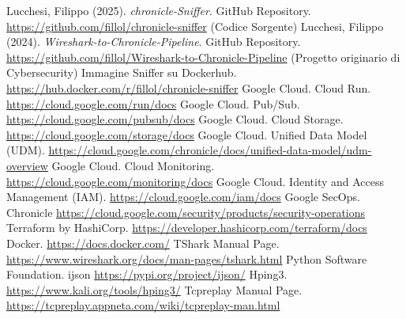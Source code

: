 \documentclass[11pt, a4paper]{article}
\begin{document}
\begin{thebibliography}{99}
     Lucchesi, Filippo (2025). \textit{chronicle-Sniffer}. GitHub Repository. \url{https://github.com/fillol/chronicle-sniffer} (Codice Sorgente)
     Lucchesi, Filippo (2024). \textit{Wireshark-to-Chronicle-Pipeline}. GitHub Repository. \url{https://github.com/fillol/Wireshark-to-Chronicle-Pipeline} (Progetto originario di Cybersecurity)
     Immagine Sniffer su Dockerhub. \url{https://hub.docker.com/r/fillol/chronicle-sniffer}
     Google Cloud. Cloud Run. \url{https://cloud.google.com/run/docs}
     Google Cloud. Pub/Sub. \url{https://cloud.google.com/pubsub/docs}
     Google Cloud. Cloud Storage. \url{https://cloud.google.com/storage/docs}
     Google Cloud. Unified Data Model (UDM). \url{https://cloud.google.com/chronicle/docs/unified-data-model/udm-overview}
     Google Cloud. Cloud Monitoring. \url{https://cloud.google.com/monitoring/docs}
     Google Cloud. Identity and Access Management (IAM). \url{https://cloud.google.com/iam/docs}
     Google SecOps. Chronicle \url{https://cloud.google.com/security/products/security-operations}
     Terraform by HashiCorp. \url{https://developer.hashicorp.com/terraform/docs}
     Docker. \url{https://docs.docker.com/}
     TShark Manual Page. \url{https://www.wireshark.org/docs/man-pages/tshark.html}
     Python Software Foundation. ijson \url{https://pypi.org/project/ijson/}
     Hping3. \url{https://www.kali.org/tools/hping3/}
     Tcpreplay Manual Page. \url{https://tcpreplay.appneta.com/wiki/tcpreplay-man.html}
\end{thebibliography}
\end{document}
